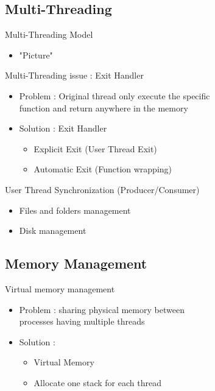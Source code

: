 \documentclass{beamer}
\begin{document}
\subsection{Multi-Threading}
\begin{frame}{Multi-Threading Model}
  \begin{itemize}
    \item "Picture"
  \end{itemize}
\end{frame}

\begin{frame}{Multi-Threading issue : Exit Handler}
  \begin{itemize}
    \item Problem : Original thread only execute the specific 
    \\function and return anywhere in the memory 
    \item Solution : Exit Handler
    \begin{itemize}
		\item Explicit Exit (User Thread Exit)
		\item Automatic Exit (Function wrapping)
    \end{itemize}
  \end{itemize}
\end{frame}

\begin{frame}{User Thread Synchronization (Producer/Consumer)}
  \begin{itemize}
    \item Files and folders management
    \item Disk management
  \end{itemize}
\end{frame}

\subsection{Memory Management}
\begin{frame}{Virtual memory management}
    \begin{itemize}
        \item Problem : sharing physical memory between 
            \\processes having multiple threads
        \item Solution  :
            \begin{itemize}
                \item Virtual Memory 
                \item Allocate one stack for each thread
            \end{itemize}
    \end{itemize}
\end{frame}
\end{document}
